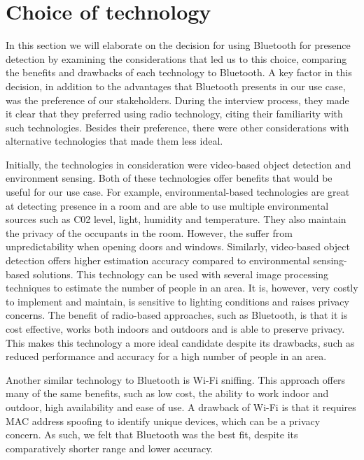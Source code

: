 \section{Choice of technology}
In this section we will elaborate on the decision for using Bluetooth for presence detection by examining the considerations that led us to this choice, comparing the benefits and drawbacks of each technology to Bluetooth.
A key factor in this decision, in addition to the advantages that Bluetooth presents in our use case, was the preference of our stakeholders. During the interview process, they made it clear that they preferred using radio technology, citing their familiarity with such technologies. 
Besides their preference, there were other considerations with alternative technologies that made them less ideal.

Initially, the technologies in consideration were video-based object detection and environment sensing. Both of these technologies offer benefits that would be useful for our use case. 
For example, environmental-based technologies are great at detecting presence in a room and are able to use multiple environmental sources such as C02 level, light, humidity and temperature. 
They also maintain the privacy of the occupants in the room. However, the suffer from unpredictability when opening doors and windows. 
Similarly, video-based object detection offers higher estimation accuracy compared to environmental sensing-based solutions. This technology can be used with several image processing techniques to estimate the number of people in an area. It is, however, very costly to implement and maintain, is sensitive to lighting conditions and raises privacy concerns.
The benefit of radio-based approaches, such as Bluetooth, is that it is cost effective, works both indoors and outdoors and is able to preserve privacy. This makes this technology a more ideal candidate despite its drawbacks, such as reduced performance and accuracy for a high number of people in an area. 

Another similar technology to Bluetooth is Wi-Fi sniffing. This approach offers many of the same benefits, such as low cost, the ability to work indoor and outdoor, high availability and ease of use. A drawback of Wi-Fi is that it requires MAC address spoofing to identify unique devices, which can be a privacy concern. As such, we felt that Bluetooth was the best fit, despite its comparatively shorter range and lower accuracy. \cite{longoAccurateOccupancyEstimation2019}


